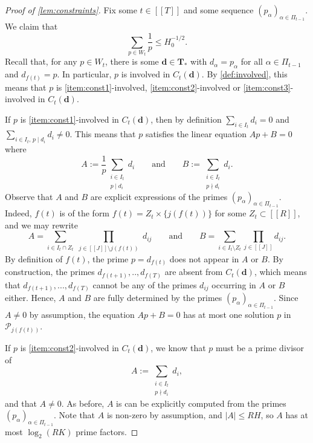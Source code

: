 \documentclass[11pt]{amsart}
\theoremstyle{definition}
\renewcommand{\leq}{\leqslant}
\newcommand{\sinterval}[1]{[\![#1]\!] }
\newcommand{\abs}[1]{\left|#1\right|}
\newcommand{\primes}{\mathcal{P}}
\renewcommand{\d}{\boldsymbol{d}}
\newcommand{\pcomp}[2]{d_{#1#2}}
\newcommand{\solpartial}{W}
\newcommand{\XX}{\mathbf{T}}
\newcommand{\repK}{K}
\newcommand{\newR}{\sinterval{J}}
\newcommand{\tupsize}{R}
\newcommand{\ncond}{T}
\begin{document}
\begin{proof}[Proof of \cref{lem:constraints}]
Fix some $t\in \sinterval{\ncond}$ and some sequence $(p_{\alpha})_{\alpha\in \Pi_{t-1}}$. We claim that  
\begin{equation}
\label{eq:sumwithcond}
	\sum_{p\in \solpartial_t} \frac{1}{p} \leq H_0^{-1/2}.
\end{equation}
Recall that, for any $p\in \solpartial_t$, there is some $\d\in\XX_*$ with $d_{\alpha} = p_{\alpha}$ for all $\alpha\in \Pi_{t-1}$ and $d_{f(t)} = p$. In particular, $p$ is involved in $C_t(\d)$. By \cref{def:involved}, this means that $p$ is \cref{item:const1}-involved, \cref{item:const2}-involved or \cref{item:const3}-involved in $C_t(\d)$.

If $p$ is \cref{item:const1}-involved in $C_t(\d)$, then by definition $\sum_{i\in I_t} d_i = 0$ and $\sum_{{i\in I_t,\, p \mid d_i}} d_i \neq 0$. This means that $p$ satisfies the linear equation $Ap + B = 0$ where
\begin{equation*}
	A := \frac{1}{p}\sum_{\substack{i\in I_t\\ p \mid d_i}} d_i\qquad\text{and}\qquad B := \sum_{\substack{i\in I_t\\ p \nmid d_i}} d_i.
\end{equation*}
Observe that $A$ and $B$ are explicit expressions of the primes $(p_{\alpha})_{\alpha\in \Pi_{t-1}}$. Indeed, $f(t)$ is of the form ${f(t) = Z_t \times \{j(f(t))\}}$ for some $Z_t\subset \sinterval{\tupsize}$, and we may rewrite
\begin{equation*}
	A = \sum_{i\in I_t \cap Z_t} \prod_{\substack{j\in \newR\setminus j(f(t))}} \pcomp{i}{j} \qquad\text{and}\qquad B = \sum_{i\in I_t\setminus Z_t} \prod_{j\in \newR} \pcomp{i}{j}.
\end{equation*}
By definition of $f(t)$, the prime $p = d_{f(t)}$ does not appear in $A$ or $B$. By construction, the primes $d_{f(t+1)} ,.., d_{f(T)}$ are absent from $C_t(\d)$, which means that $d_{f(t+1)} ,..., d_{f(T)}$ cannot be any of the primes $\pcomp{i}{j}$ occurring in $A$ or $B$ either. Hence, $A$ and $B$ are fully determined by the primes $(p_{\alpha})_{\alpha\in \Pi_{t-1}}$. Since $A\neq 0$ by assumption, the equation $Ap + B = 0$ has at most one solution $p$ in $\primes_{\!j(f(t))}$. 

If $p$ is \cref{item:const2}-involved in $C_t(\d)$, we know that $p$ must be a prime divisor of 
\begin{equation*}
	A := \sum_{\substack{i\in I_t\\ p \nmid d_i}} d_i,
\end{equation*}
and that $A\neq 0$. As before, $A$ is can be explicitly computed from the primes $(p_{\alpha})_{\alpha\in \Pi_{t-1}}$. Note that $A$ is non-zero by assumption, and $\abs{A} \leq \tupsize H$, so $A$ has at most $\log_2(\tupsize \repK)$ prime factors.


\end{proof}
\end{document}
